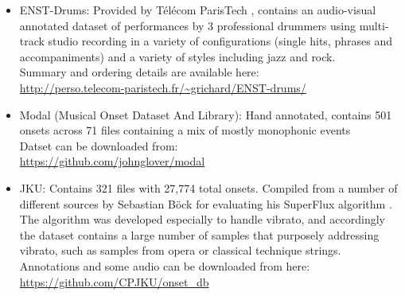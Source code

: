 \begin{itemize}
  \item ENST-Drums: Provided by Télécom ParisTech \citep{Gillet2006}, contains an audio-visual annotated dataset of performances by 3 professional drummers using multi-track studio recording in a variety of configurations (single hits, phrases and accompaniments) and a variety of styles including jazz and rock. \\
Summary and ordering details are available here:\\
	\url{http://perso.telecom-paristech.fr/~grichard/ENST-drums/}
  \item Modal (Musical Onset Dataset And Library): Hand annotated, contains 501 onsets across 71 files containing a mix of mostly monophonic events \citep{Glover2011}\\
Datset can be downloaded from:\\
\url{https://github.com/johnglover/modal}
  \item JKU: Contains 321 files with 27,774 total onsets. Compiled from a number of different sources by Sebastian Böck for evaluating his SuperFlux algorithm \citep{Bock2013}. The algorithm was developed especially to handle vibrato, and accordingly the dataset contains a large number of samples that purposely addressing vibrato, such as samples from opera or classical technique strings.\\
Annotations and some audio can be downloaded from here:\\
\url{https://github.com/CPJKU/onset_db}
\end{itemize}
%
%
%
%
